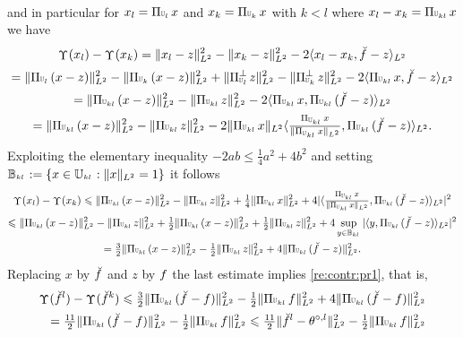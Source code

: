 \begin{pro}
\begin{multline*}
\end{multline*}
and in particular for $x_l=\dProj{l}{}x$ and $x_k=\dProj{k}{}x$ with $k<l$
where $x_l-x_k=\dProj{k}{l}x$ we have
\begin{multline}\label{scd:le:op:pr:e1}
 \contr[](x_l)-\contr[](x_k)
=
\VnormLp{x_l-z}^2-\VnormLp{x_k-z}^2-2\VskalarLp{x_l-x_k,\dxdfPr[]-z}\\
=\VnormLp{\dProj{l}{}(x-z)}^2-\VnormLp{\dProj{k}{}(x-z)}^2+
\VnormLp{\dProjC{l}{}z}^2-\VnormLp{\dProjC{k}{}z}^2
-2\VskalarLp{\dProj{k}{l}x,\dxdfPr[]-z}\\
=\VnormLp{\dProj{k}{l}(x-z)}^2-
\VnormLp{\dProj{k}{l}z}^2-2\VskalarLp{\dProj{k}{l}x,\dProj{k}{l}(\dxdfPr[]-z)}\\
=\VnormLp{\dProj{k}{l}(x-z)}^2-
 \VnormLp{\dProj{k}{l}z}^2-2\VnormLp{\dProj{k}{l}x}\VskalarLp{\tfrac{\dProj{k}{l}x}{\VnormLp{\dProj{k}{l}x}},\dProj{k}{l}(\dxdfPr[]-z)}.
\end{multline}
Exploiting the elementary inequality $-2ab\leq \tfrac{1}{4}a^2+4b^2$
and setting $\dmBaH{k}{l}:=\{x\in\dmHiH{k}{l}:\VnormLp{x}=1\}$
it follows 
\begin{multline*}
 \contr[](x_l)-\contr[](x_k)
\leq \VnormLp{\dProj{k}{l}(x-z)}^2-
\VnormLp{\dProj{k}{l}z}^2+ \tfrac{1}{4}\VnormLp{\dProj{k}{l}x}^2 +
4|\VskalarLp{\tfrac{\dProj{k}{l}x}{\VnormLp{\dProj{k}{l}x}},\dProj{k}{l}(\dxdfPr[]-z)}|^2\\
\leq \VnormLp{\dProj{k}{l}(x-z)}^2-
\VnormLp{\dProj{k}{l}z}^2+ \tfrac{1}{2}\VnormLp{\dProj{k}{l}(x-z)}^2+ \tfrac{1}{2}\VnormLp{\dProj{k}{l}z}^2 +
4\sup_{y\in\dmBaH{k}{l}} |\VskalarLp{y,\dProj{k}{l}(\dxdfPr[]-z)}|^2\\
 = \tfrac{3}{2}\VnormLp{\dProj{k}{l}(x-z)}^2-\tfrac{1}{2}
 \VnormLp{\dProj{k}{l}z}^2 + 4 \VnormLp{\dProj{k}{l}(\dxdfPr[]-z)}^2.
\end{multline*}
 Replacing $x$ by $\dxdfPr[]$ and $z$ by $\xdf$ the last estimate
 implies \eqref{re:contr:pr1}, that is, 
\begin{multline*}
\contr[](\dxdfPr[l])-\contr[](\dxdfPr[k])
\leq \tfrac{3}{2}\VnormLp{\dProj{k}{l}(\dxdfPr[]-\xdf)}^2-\tfrac{1}{2}
\VnormLp{\dProj{k}{l}\xdf}^2 + 4 \VnormLp{\dProj{k}{l}(\dxdfPr[]-\xdf)}^2\\
\hfill=\tfrac{11}{2}\VnormLp{\dProj{k}{l}(\dxdfPr[]-\xdf)}^2-\tfrac{1}{2}
\VnormLp{\dProj{k}{l}\xdf}^2%
\leq\tfrac{11}{2}\VnormLp{\dxdfPr[l]-\xdfPr[l]}^2-\tfrac{1}{2}
\VnormLp{\dProj{k}{l}\xdf}^2

\end{multline*}
\end{pro}
